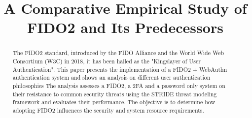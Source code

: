 \documentclass[conference,compsoc]{IEEEtran}
\begin{document}
\title{A Comparative Empirical Study of FIDO2 and Its Predecessors}

\author{
}

\maketitle

\begin{abstract}
The FIDO2 standard, introduced by the FIDO Alliance and the World Wide Web Consortium (W3C) in 2018, it has been hailed as the "Kingslayer of User Authentication".
This paper presents the implementation of a FIDO2 + WebAuthn authentication system and shows an analysis on different user authentication philosophies
The analysis assesses a FIDO2, a 2FA and a password only system on their resistance to common security threats using the STRIDE threat modeling framework and evaluates their performance.
The objective is to determine how adopting FIDO2 influences the security and system resource requirements.
\end{abstract}

























\end{document}
